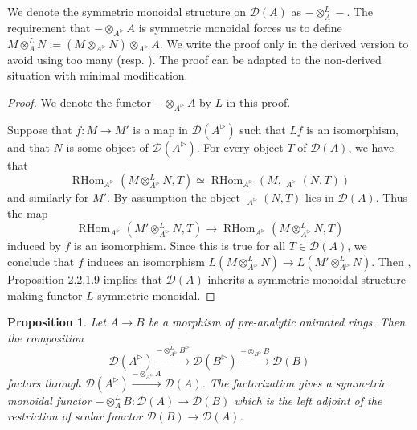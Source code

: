 \documentclass{article}
\theoremstyle{plain}
\newtheorem{prop}[thm]{Proposition}
\theoremstyle{definition}
\theoremstyle{remark}
\DeclareMathOperator{\rhom}{RHom}
\DeclareMathOperator{\rhoms}{\underline{RHom}}
\newcommand{\dten}{\otimes ^{L}}
\newcommand{\huflag}{\triangleright}
\newcommand{\D}{\mathcal{D}}
\newcommand{\resp}[1]{{\color{respcolor}(resp. #1)}}
\begin{document}
We denote the symmetric monoidal structure on $ \D (A) $ as $ -\dten _{A} - $.
The requirement that $ -\otimes _{A ^{\huflag}} A $ is symmetric monoidal forces us to define
$ M \dten _{A} N := (M \otimes _{A ^{\huflag}} N)\otimes _{A ^{\huflag}} A $.
We write the proof only in the derived version to avoid using too many \resp{}.
The proof can be adapted to the non-derived situation with minimal modification.

\begin{proof}
We denote the functor $ -\otimes _{A ^{\huflag}} A $ by $ L $ in this proof.

Suppose that $ f: M\to M' $ is a map in $ \D (A ^{\huflag}) $
such that $ Lf $ is an isomorphism, and that $ N $ is some object of $ \D (A ^{\huflag}) $.
For every object $ T $ of $ \D (A) $, we have that
\begin{equation*}
\rhom _{A ^{\huflag}}(M \dten _{A ^{\huflag}} N, T) \simeq \rhom _{A ^{\huflag}}(M, \rhoms _{A ^{\huflag}}(N, T))
\end{equation*}
and similarly for $ M' $.
By assumption the object $ \rhoms _{A ^{\huflag}}(N, T) $ lies in $ \D (A) $.
Thus the map
\begin{equation*}
\rhom _{A ^{\huflag}}(M' \dten _{A ^{\huflag}} N, T) \to \rhom _{A ^{\huflag}}(M \dten _{A ^{\huflag}} N, T)
\end{equation*}
induced by $ f $ is an isomorphism.
Since this is true for all $ T\in \D (A) $, we conclude that $ f $ induces an isomorphism
$ L(M\dten _{A ^{\huflag}} N)\to L(M' \dten _{A ^{\huflag}} N) $.
Then \cite{ha}, Proposition 2.2.1.9 implies that $ \D (A) $ inherits a symmetric monoidal structure making functor $ L $ symmetric monoidal.
\end{proof}

\begin{prop}
Let $ A\to B $ be a morphism of pre-analytic animated rings. Then the composition
\begin{equation*}
\D (A ^{\huflag}) \xrightarrow{- \dten _{A ^{\huflag}} B ^{\huflag}} \D (B ^{\huflag}) \xrightarrow{-\otimes _{B ^{\huflag}} B} \D (B)
\end{equation*}
factors through $ \D (A ^{\huflag}) \xrightarrow{-\otimes _{A ^{\huflag}} A}\D (A) $.
The factorization gives a symmetric monoidal functor $ -\dten _{A} B: \D (A)\to \D (B) $
which is the left adjoint of the restriction of scalar functor $ \D (B)\to \D (A) $.
\end{prop}
\end{document}
